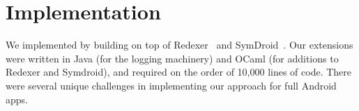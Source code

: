 






\section{Implementation}
\label{sec:implementation}

We implemented \hogarth{} by building on top of Redexer~\cite{jsjeon:spsm12} and
SymDroid~\cite{jeon:2012:symdroid}. Our extensions were written in Java
(for the logging machinery) and OCaml (for additions to Redexer and Symdroid),
and required on the order of 10,000 lines of code.
There were several unique challenges in implementing our approach for
full Android apps.

